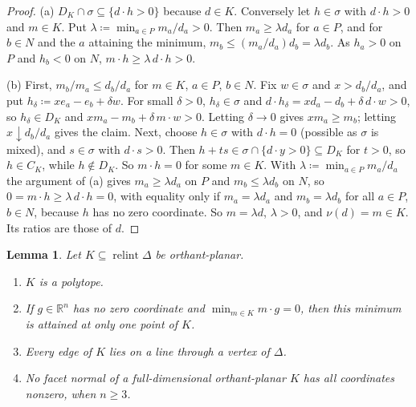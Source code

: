 \documentclass[11pt]{article}
\newcommand{\R}{\mathbb{R}}
\DeclareMathOperator{\relint}{relint}
\theoremstyle{plain}
\newtheorem{lemma}[theorem]{Lemma}
\theoremstyle{definition}
\theoremstyle{remark}
\begin{document}
\begin{proof}
(a) $D_K\cap\sigma\subseteq\{d\cdot h>0\}$ because $d\in K$. Conversely let $h\in\sigma$
with $d\cdot h>0$ and $m\in K$. Put $\lambda\coloneqq\min_{a\in P}m_a/d_a>0$. Then
$m_a\ge\lambda d_a$ for $a\in P$, and for $b\in N$ and the $a$ attaining the minimum,
$m_b\le(m_a/d_a)d_b=\lambda d_b$. As $h_a>0$ on $P$ and $h_b<0$ on $N$,
$m\cdot h\ge\lambda\,d\cdot h>0$.

(b) First, $m_b/m_a\le d_b/d_a$ for $m\in K$, $a\in P$, $b\in N$. Fix $w\in\sigma$ and
$x>d_b/d_a$, and put $h_\delta\coloneqq xe_a-e_b+\delta w$. For small $\delta>0$,
$h_\delta\in\sigma$ and $d\cdot h_\delta=xd_a-d_b+\delta\,d\cdot w>0$, so $h_\delta\in D_K$
and $xm_a-m_b+\delta\,m\cdot w>0$. Letting $\delta\to0$ gives $xm_a\ge m_b$; letting
$x\downarrow d_b/d_a$ gives the claim. Next, choose $h\in\sigma$ with $d\cdot h=0$ (possible
as $\sigma$ is mixed), and $s\in\sigma$ with $d\cdot s>0$. Then $h+ts\in\sigma\cap
\{d\cdot y>0\}\subseteq D_K$ for $t>0$, so $h\in C_K$, while $h\notin D_K$. So $m\cdot h=0$
for some $m\in K$. With $\lambda\coloneqq\min_{a\in P}m_a/d_a$ the argument of (a) gives
$m_a\ge\lambda d_a$ on $P$ and $m_b\le\lambda d_b$ on $N$, so $0=m\cdot h\ge\lambda\,d\cdot
h=0$, with equality only if $m_a=\lambda d_a$ and $m_b=\lambda d_b$ for all $a\in P$,
$b\in N$, because $h$ has no zero coordinate. So $m=\lambda d$, $\lambda>0$, and
$\nu(d)=m\in K$. Its ratios are those of $d$.
\end{proof}

\begin{lemma}\label{lem:planarobs}
Let $K\subseteq\relint\Delta$ be orthant-planar.
\begin{enumerate}[label=(\alph*)]
  \item $K$ is a polytope.
  \item If $g\in\R^n$ has no zero coordinate and $\min_{m\in K}m\cdot g=0$, then this
  minimum is attained at only one point of $K$.
  \item Every edge of $K$ lies on a line through a vertex of $\Delta$.
  \item No facet normal of a full-dimensional orthant-planar $K$ has all coordinates
  nonzero, when $n\ge3$.
\end{enumerate}
\end{lemma}
\end{document}

